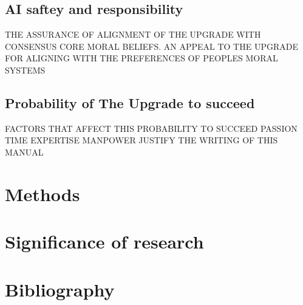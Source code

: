 \documentclass[12pt]{article}
\begin{document}
\subsection*{AI saftey and responsibility}
THE ASSURANCE OF ALIGNMENT OF THE UPGRADE WITH CONSENSUS CORE MORAL BELIEFS.
AN APPEAL TO THE UPGRADE FOR ALIGNING WITH THE PREFERENCES OF PEOPLES MORAL SYSTEMS
\subsection*{Probability of The Upgrade to succeed}
FACTORS THAT AFFECT THIS PROBABILITY TO SUCCEED
PASSION
TIME
EXPERTISE
MANPOWER
JUSTIFY THE WRITING OF THIS MANUAL 
\section*{Methods}
\section*{Significance of research}
\section*{Bibliography}

\end{document}
